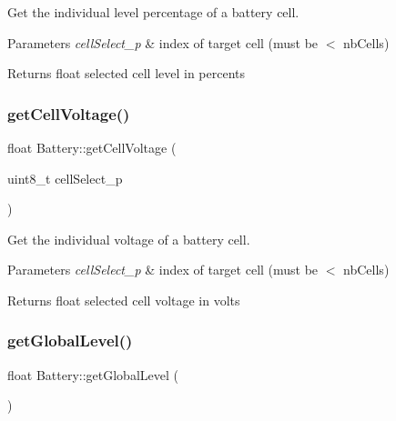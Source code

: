 Get the individual level percentage of a battery cell. 


\begin{DoxyParams}{Parameters}
{\em cell\+Select\+\_\+p} & index of target cell (must be $<$ nb\+Cells) \\
\hline
\end{DoxyParams}
\begin{DoxyReturn}{Returns}
float selected cell level in percents 
\end{DoxyReturn}
\mbox{\label{class_battery_ae449209593f825ca7cefc958d51ba232}} 
\subsubsection{\texorpdfstring{get\+Cell\+Voltage()}{getCellVoltage()}}
{\footnotesize\ttfamily float Battery\+::get\+Cell\+Voltage (\begin{DoxyParamCaption}\item[{uint8\+\_\+t}]{cell\+Select\+\_\+p }\end{DoxyParamCaption})}



Get the individual voltage of a battery cell. 


\begin{DoxyParams}{Parameters}
{\em cell\+Select\+\_\+p} & index of target cell (must be $<$ nb\+Cells) \\
\hline
\end{DoxyParams}
\begin{DoxyReturn}{Returns}
float selected cell voltage in volts 
\end{DoxyReturn}
\mbox{\label{class_battery_a16e5bfb8a07ce93c08382fbcfb0b19be}} 
\subsubsection{\texorpdfstring{get\+Global\+Level()}{getGlobalLevel()}}
{\footnotesize\ttfamily float Battery\+::get\+Global\+Level (\begin{DoxyParamCaption}{ }\end{DoxyParamCaption})}



